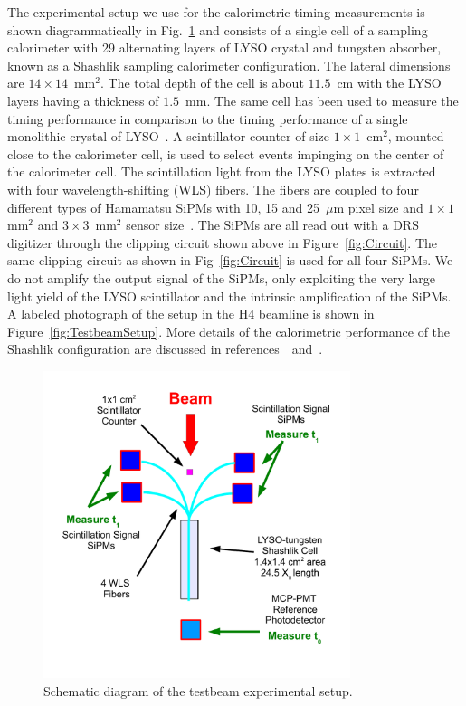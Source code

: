 The experimental setup we use for the calorimetric timing measurements 
is shown diagrammatically in Fig.~\ref{fig:TestbeamSchematic} and consists
of a single cell of a sampling calorimeter with 29 alternating layers of LYSO
crystal and tungsten absorber, known as a Shashlik sampling
calorimeter configuration. The lateral dimensions are
$14\times14$~$\mathrm{mm}^{2}$. The total depth of the cell is about $11.5$~cm
with the LYSO layers having a thickness of $1.5$~mm. The same cell has been used
to measure the timing performance in comparison to the timing performance of a
single monolithic crystal of LYSO~\cite{Anderson:2015gha}. A scintillator
counter of size $1\times 1$~$\mathrm{cm}^{2}$, mounted close to the calorimeter
cell, is used to select events impinging on the center of the calorimeter cell. The
scintillation light from the LYSO plates is extracted with four
wavelength-shifting (WLS) fibers. The fibers are coupled to four different types
of Hamamatsu SiPMs with 10, 15 and 25~$\mu$m pixel size and $1\times
1$~$\mathrm{mm}^{2}$ and $3\times 3$~$\mathrm{mm}^{2}$ sensor
size~\cite{hamamatsuMPPC}. The SiPMs are all read out with a DRS digitizer
through the clipping circuit shown above in Figure~\ref{fig:Circuit}. The same
clipping circuit as shown in Fig~\ref{fig:Circuit} is used for all four SiPMs.
We do not amplify the output signal of the SiPMs, only exploiting the very large
light yield of the LYSO scintillator and the intrinsic amplification of the
SiPMs. A labeled photograph of the setup in the H4 beamline is shown in
Figure~\ref{fig:TestbeamSetup}. More details of the calorimetric
performance of the Shashlik configuration are discussed in
references~\cite{shashlik1}~and~\cite{shashlik2}.

\begin{figure}[htbp] 
\centering
\includegraphics[width=0.80\textwidth]{figures/ShashlikFiberSetupSchematic} 
\caption{Schematic diagram of the testbeam experimental setup.} 
\label{fig:TestbeamSchematic} 
\end{figure} 

